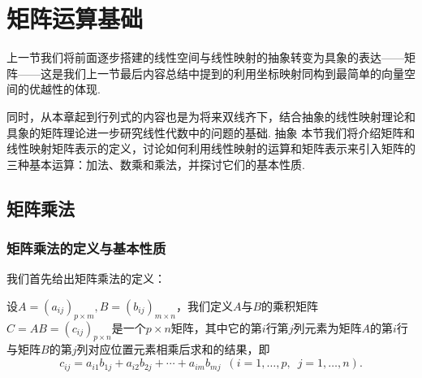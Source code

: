 \chapter{矩阵运算基础}

上一节我们将前面逐步搭建的线性空间与线性映射的抽象转变为具象的表达——矩阵——这是我们上一节最后内容总结中提到的利用坐标映射同构到最简单的向量空间的优越性的体现.

同时，从本章起到行列式的内容也是为将来双线齐下，结合抽象的线性映射理论和具象的矩阵理论进一步研究线性代数中的问题的基础. 抽象
本节我们将介绍矩阵和线性映射矩阵表示的定义，讨论如何利用线性映射的运算和矩阵表示来引入矩阵的三种基本运算：加法、数乘和乘法，并探讨它们的基本性质.

\section{矩阵乘法}

\subsection{矩阵乘法的定义与基本性质}

我们首先给出矩阵乘法的定义：
\begin{definition}{}{}
    设$A=(a_{ij})_{p\times m},B=(b_{ij})_{m\times n}$，我们定义$A$与$B$的乘积矩阵$C=AB=(c_{ij})_{p\times n}$是一个$p\times n$矩阵，其中它的第$i$行第$j$列元素为矩阵$A$的第$i$行与矩阵$B$的第$j$列对应位置元素相乘后求和的结果，即
    \[c_{ij}=a_{i1}b_{1j}+a_{i2}b_{2j}+\cdots+a_{im}b_{mj}\enspace(i=1,\ldots,p,\enspace j=1,\ldots,n).\]
\end{definition}

